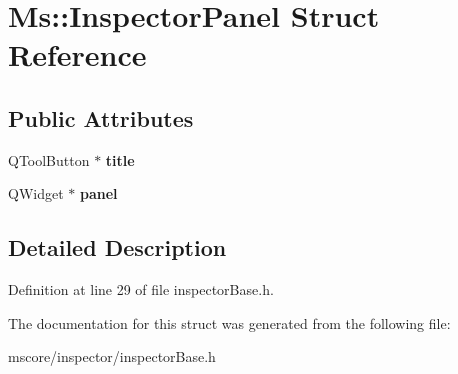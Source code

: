 \hypertarget{struct_ms_1_1_inspector_panel}{}\section{Ms\+:\+:Inspector\+Panel Struct Reference}
\label{struct_ms_1_1_inspector_panel}
\subsection*{Public Attributes}
\begin{DoxyCompactItemize}
\item 
\mbox{\label{struct_ms_1_1_inspector_panel_a5a5daee1c0c27cb93ad0b7dff7e24258}} 
Q\+Tool\+Button $\ast$ {\bfseries title}
\item 
\mbox{\label{struct_ms_1_1_inspector_panel_a0a3606c64189584842eb06e03a40f582}} 
Q\+Widget $\ast$ {\bfseries panel}
\end{DoxyCompactItemize}


\subsection{Detailed Description}


Definition at line 29 of file inspector\+Base.\+h.



The documentation for this struct was generated from the following file\+:\begin{DoxyCompactItemize}
\item 
mscore/inspector/inspector\+Base.\+h\end{DoxyCompactItemize}
